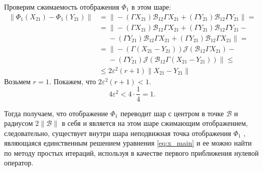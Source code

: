 \begin{enumerate}
Проверим сжимаемость отображения $\Phi_1$ в этом шаре:
\begin{align*}
\|\Phi_1(X_{21}) - \Phi_1(Y_{21}) \| &= \| -(\Gamma X_{21})\mathcal{B}_{12}\Gamma X_{21} + (\Gamma Y_{21})\mathcal{B}_{12}\Gamma Y_{21}\|  = \\ 
&= \| -(\Gamma X_{21})\mathcal{B}_{12}\Gamma X_{21} + (\Gamma Y_{21})\mathcal{B}_{12}\Gamma Y_{21} - \\
& \phantom{=} -(\Gamma Y_{21})\mathcal{B}_{12}\Gamma X_{21} + (\Gamma Y_{21})\mathcal{B}_{12}\Gamma X_{21}\| = \\
 &= \| - (\Gamma (X_{21} - Y_{21})) \mathcal{J}(\mathcal{B}_{12}\Gamma X_{21}) - \\
 & \phantom{=} - (\Gamma Y_{21})\mathcal{J}(\mathcal{B}_{12}\Gamma (X_{21} - Y_{21})) \| \leqslant \\
 &\leqslant 2\varepsilon ^2 (r + 1)\| X_{21} - Y_{21} \| 
\end{align*}
Возьмем $r = 1.$ Покажем, что $2\varepsilon ^2 (r + 1) < 1.$
$$
4\varepsilon ^2 < 4 \cdot \frac{1}{4} = 1.
$$

Тогда получаем, что отображение $\Phi_1$ переводит шар с центром в точке $\mathcal{B}$ и радиусом $2\|\mathcal{B}\|$ в себя и является на этом шаре сжимающим отображением, следовательно, существует внутри шара неподвижная точка отображения $\Phi_1$ , являющаяся единственным решением уравнения \eqref{eq:x_main} и ее можно найти по методу простых итераций, используя в качестве первого приближения нулевой оператор.


\end{enumerate}
